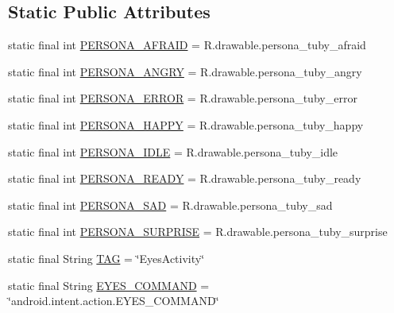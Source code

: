 \subsection*{Static Public Attributes}
\begin{DoxyCompactItemize}
\item 
static final int \hyperlink{classcom_1_1cellbots_1_1local_1_1_eyes_view_a01161589440a2dad4be28de49d633308}{P\-E\-R\-S\-O\-N\-A\-\_\-\-A\-F\-R\-A\-I\-D} = R.\-drawable.\-persona\-\_\-tuby\-\_\-afraid
\item 
static final int \hyperlink{classcom_1_1cellbots_1_1local_1_1_eyes_view_a02d568320de6be07ebf3dc61459426e7}{P\-E\-R\-S\-O\-N\-A\-\_\-\-A\-N\-G\-R\-Y} = R.\-drawable.\-persona\-\_\-tuby\-\_\-angry
\item 
static final int \hyperlink{classcom_1_1cellbots_1_1local_1_1_eyes_view_aa983bbc9c5ee5cf093bc56da6f4e4f5c}{P\-E\-R\-S\-O\-N\-A\-\_\-\-E\-R\-R\-O\-R} = R.\-drawable.\-persona\-\_\-tuby\-\_\-error
\item 
static final int \hyperlink{classcom_1_1cellbots_1_1local_1_1_eyes_view_aa4dd55d01c9282aacc8bc67ad4c16d02}{P\-E\-R\-S\-O\-N\-A\-\_\-\-H\-A\-P\-P\-Y} = R.\-drawable.\-persona\-\_\-tuby\-\_\-happy
\item 
static final int \hyperlink{classcom_1_1cellbots_1_1local_1_1_eyes_view_a6eca5310e08a5f2a88d26fda0aeae437}{P\-E\-R\-S\-O\-N\-A\-\_\-\-I\-D\-L\-E} = R.\-drawable.\-persona\-\_\-tuby\-\_\-idle
\item 
static final int \hyperlink{classcom_1_1cellbots_1_1local_1_1_eyes_view_a649ceb68bda92b7ee23ae078cf369aa2}{P\-E\-R\-S\-O\-N\-A\-\_\-\-R\-E\-A\-D\-Y} = R.\-drawable.\-persona\-\_\-tuby\-\_\-ready
\item 
static final int \hyperlink{classcom_1_1cellbots_1_1local_1_1_eyes_view_aded5fba0c87a65488adc6045477c943c}{P\-E\-R\-S\-O\-N\-A\-\_\-\-S\-A\-D} = R.\-drawable.\-persona\-\_\-tuby\-\_\-sad
\item 
static final int \hyperlink{classcom_1_1cellbots_1_1local_1_1_eyes_view_a1c8c5bf7328878c12c464030465686a4}{P\-E\-R\-S\-O\-N\-A\-\_\-\-S\-U\-R\-P\-R\-I\-S\-E} = R.\-drawable.\-persona\-\_\-tuby\-\_\-surprise
\item 
static final String \hyperlink{classcom_1_1cellbots_1_1local_1_1_eyes_view_ae8564614b3a622836ca68f64cf33108c}{T\-A\-G} = \char`\"{}Eyes\-Activity\char`\"{}
\item 
static final String \hyperlink{classcom_1_1cellbots_1_1local_1_1_eyes_view_a4ce042eb950d222c4e5a3d8178f61851}{E\-Y\-E\-S\-\_\-\-C\-O\-M\-M\-A\-N\-D} = \char`\"{}android.\-intent.\-action.\-E\-Y\-E\-S\-\_\-\-C\-O\-M\-M\-A\-N\-D\char`\"{}
\end{DoxyCompactItemize}



